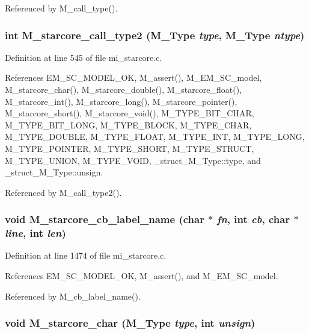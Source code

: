 Referenced by M\_\-call\_\-type().
\subsubsection{\setlength{\rightskip}{0pt plus 5cm}int M\_\-starcore\_\-call\_\-type2 (\bf{M\_\-Type} {\em type}, \bf{M\_\-Type} {\em ntype})}\label{m__starcore_8h_6f547e5dd50c6c8d45a4202e285adf89}




Definition at line 545 of file mi\_\-starcore.c.

References EM\_\-SC\_\-MODEL\_\-OK, M\_\-assert(), M\_\-EM\_\-SC\_\-model, M\_\-starcore\_\-char(), M\_\-starcore\_\-double(), M\_\-starcore\_\-float(), M\_\-starcore\_\-int(), M\_\-starcore\_\-long(), M\_\-starcore\_\-pointer(), M\_\-starcore\_\-short(), M\_\-starcore\_\-void(), M\_\-TYPE\_\-BIT\_\-CHAR, M\_\-TYPE\_\-BIT\_\-LONG, M\_\-TYPE\_\-BLOCK, M\_\-TYPE\_\-CHAR, M\_\-TYPE\_\-DOUBLE, M\_\-TYPE\_\-FLOAT, M\_\-TYPE\_\-INT, M\_\-TYPE\_\-LONG, M\_\-TYPE\_\-POINTER, M\_\-TYPE\_\-SHORT, M\_\-TYPE\_\-STRUCT, M\_\-TYPE\_\-UNION, M\_\-TYPE\_\-VOID, \_\-struct\_\-M\_\-Type::type, and \_\-struct\_\-M\_\-Type::unsign.

Referenced by M\_\-call\_\-type2().
\subsubsection{\setlength{\rightskip}{0pt plus 5cm}void M\_\-starcore\_\-cb\_\-label\_\-name (char $\ast$ {\em fn}, int {\em cb}, char $\ast$ {\em line}, int {\em len})}\label{m__starcore_8h_4cbf5e30a247c47103a5ba69a511a3cb}




Definition at line 1474 of file mi\_\-starcore.c.

References EM\_\-SC\_\-MODEL\_\-OK, M\_\-assert(), and M\_\-EM\_\-SC\_\-model.

Referenced by M\_\-cb\_\-label\_\-name().
\subsubsection{\setlength{\rightskip}{0pt plus 5cm}void M\_\-starcore\_\-char (\bf{M\_\-Type} {\em type}, int {\em unsign})}\label{m__starcore_8h_2b8988132427cd14863cf2bf9fce1a65}




